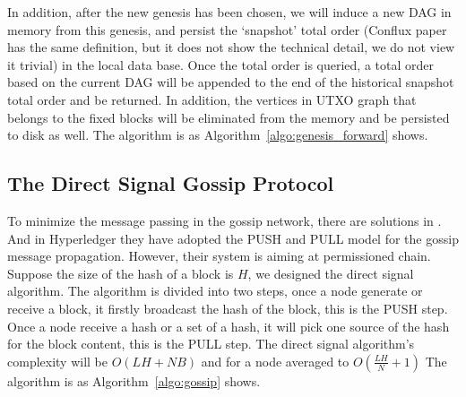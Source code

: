 In addition, after the new genesis has been chosen, 
we will induce a new DAG in memory from this genesis,
and persist the `snapshot' total order (Conflux paper has the same definition, 
but it does not show the technical detail, we do not view it trivial) in the local data base.
Once the total order is queried, a total order based on the current DAG will be appended to the end of the historical
snapshot total order and be returned.
In addition, the vertices in UTXO graph that belongs to the fixed blocks will 
be eliminated from the memory and be persisted to disk as well.  
The algorithm is as Algorithm~\ref{algo:genesis_forward} shows.



\subsection{The Direct Signal Gossip Protocol}
To minimize the message passing in the gossip network,
there are solutions in \cite{demers1988epidemic}. And in Hyperledger \cite{androulaki2018hyperledger}
they have adopted the PUSH and PULL model for the gossip message propagation. However, their system is aiming at permissioned chain.
Suppose the size of the hash of a block is $H$, we designed the direct signal algorithm.
The algorithm is divided into two steps, once a node generate or receive a block,
it firstly broadcast the hash of the block, this is the PUSH step.
Once a node receive a hash or a set of a hash,
it will pick one source of the hash for the block content, this is the PULL step.
The direct signal algorithm's complexity will be $O(LH + NB)$ and for a node averaged to $O(\frac{LH}{N} + 1)$
The algorithm is as Algorithm~\ref{algo:gossip} shows.


